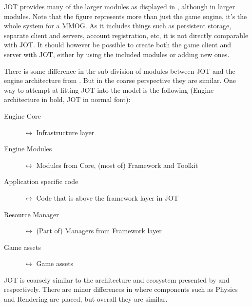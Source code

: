JOT provides many of the larger modules as displayed in , although in larger modules. Note that the figure represents more than just the game engine, it's the whole system for a MMOG.
As it includes things such as persistent storage, separate client and servers, account registration, etc, it is not directly comparable with JOT.
It should however be possible to create both the game client and server with JOT, either by using the included modules or adding new ones.

There is some difference in the sub-division of modules between JOT and the engine architecture from \cite{5962102}. But in the coarse perspective they are similar. One way to attempt at fitting JOT into the model is the following (Engine architecture in bold, JOT in normal font): 
\begin{description} 
    \item[Engine Core] $\longleftrightarrow$ Infrastructure layer
    \item[Engine Modules] $\longleftrightarrow$ Modules from Core, (most of) Framework and Toolkit
    \item[Application specific code] $\longleftrightarrow$ Code that is above the framework layer in JOT
    \item[Resource Manager] $\longleftrightarrow$ (Part of) Managers from Framework layer
    \item[Game assets] $\longleftrightarrow$ Game assets
\end{description}

JOT is coarsely similar to the architecture and ecosystem presented by \cite{5962102} and \cite{blow2004game} respectively. There are minor differences in where components such as Physics and Rendering are placed, but overall they are similar.

